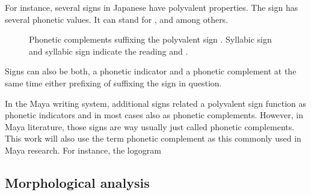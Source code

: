 \documentclass[../main.tex]{subfiles}
\begin{document}
For instance, several signs in Japanese have polyvalent properties.
The sign  has several phonetic values.
It can stand for ,  and  among others.
\begin{figure}[h!]
    \centering
    \caption[Japanese phonetic complements]{Phonetic complements suffixing the
             polyvalent sign .
            Syllabic sign   and 
            syllabic sign   indicate the reading
              and 
             .}
\end{figure}
Signs can also be both, a phonetic indicator and a phonetic complement at the same time either
prefixing of suffixing the sign in question.

In the Maya writing system, additional signs related a polyvalent sign function 
as phonetic indicators and in most cases also as phonetic complements.
However, in Maya literature, those signs are way usually just called phonetic complements.
This work will also use the term phonetic complement as this commonly used in Maya research.
For instance, the logogram  


\subsection{Morphological analysis}
\end{document}
